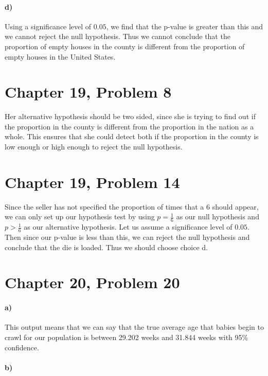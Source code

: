 \documentclass[12pt]{article}
\begin{document}
\paragraph{d)}

Using a significance level of \(0.05\), we find that the p-value is greater than this and we cannot reject the null hypothesis.
Thus we cannot conclude that the proportion of empty houses in the county is different from the proportion of empty houses in the
United States.

\section*{Chapter 19, Problem 8}

Her alternative hypothesis should be two sided, since she is trying to find out if the proportion in the county is
different from the proportion in the nation as a whole. This ensures that she could detect both if the proportion in the
county is low enough or high enough to reject the null hypothesis.

\section*{Chapter 19, Problem 14}

Since the seller has not specified the proportion of times that a 6 should appear, we can only set up our hypothesis
test by using \(p=\frac{1}{6}\) as our null hypothesis and \(p>\frac{1}{6}\) as our alternative hypothesis. Let
us assume a significance level of \(0.05\). Then since our p-value is less than this, we can reject the null hypothesis
and conclude that the die is loaded. Thus we should choose choice d.

\section*{Chapter 20, Problem 20}

\paragraph{a)}

This output means that we can say that the true average age that babies begin to crawl for our population is
between 29.202 weeks and 31.844 weeks with 95\% confidence.

\paragraph{b)}
\end{document}
